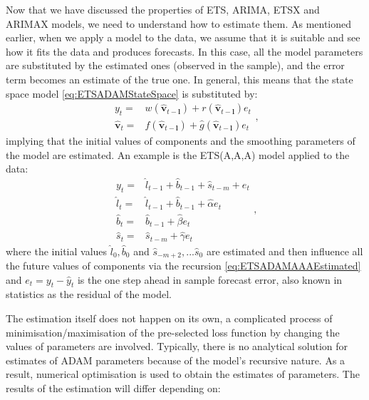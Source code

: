 \documentclass[
]{book}
\theoremstyle{definition}
\theoremstyle{definition}
\theoremstyle{definition}
\theoremstyle{definition}
\theoremstyle{remark}
\begin{document}
Now that we have discussed the properties of ETS, ARIMA, ETSX and ARIMAX models, we need to understand how to estimate them. As mentioned earlier, when we apply a model to the data, we assume that it is suitable and see how it fits the data and produces forecasts. In this case, all the model parameters are substituted by the estimated ones (observed in the sample), and the error term becomes an estimate of the true one. In general, this means that the state space model \eqref{eq:ETSADAMStateSpace} is substituted by:
\begin{equation}
  \begin{aligned}
    {y}_{t} = &w(\hat{\mathbf{v}}_{t-\mathbf{l}}) + r(\hat{\mathbf{v}}_{t-\mathbf{l}}) e_t \\
    \hat{\mathbf{v}}_{t} = &f(\hat{\mathbf{v}}_{t-\mathbf{l}}) + \hat{g}(\hat{\mathbf{v}}_{t-\mathbf{l}}) e_t
  \end{aligned},
  \label{eq:ETSADAMStateSpaceEstimatedAgain}
\end{equation}
implying that the initial values of components and the smoothing parameters of the model are estimated. An example is the ETS(A,A,A) model applied to the data:
\begin{equation}
  \begin{aligned}
    y_{t} = & \hat{l}_{t-1} + \hat{b}_{t-1} + \hat{s}_{t-m} + e_t \\
    \hat{l}_t = & \hat{l}_{t-1} + \hat{b}_{t-1} + \hat{\alpha} e_t \\
    \hat{b}_t = & \hat{b}_{t-1} + \hat{\beta} e_t \\
    \hat{s}_t = & \hat{s}_{t-m} + \hat{\gamma} e_t 
  \end{aligned},
  \label{eq:ETSADAMAAAEstimated}
\end{equation}
where the initial values \(\hat{l}_0, \hat{b}_0\) and \(\hat{s}_{-m+2}, ... \hat{s}_0\) are estimated and then influence all the future values of components via the recursion \eqref{eq:ETSADAMAAAEstimated} and \(e_t = y_t -\hat{y}_t\) is the one step ahead in sample forecast error, also known in statistics as the residual of the model.

The estimation itself does not happen on its own, a complicated process of minimisation/maximisation of the pre-selected loss function by changing the values of parameters are involved. Typically, there is no analytical solution for estimates of ADAM parameters because of the model's recursive nature. As a result, numerical optimisation is used to obtain the estimates of parameters. The results of the estimation will differ depending on:
\end{document}
